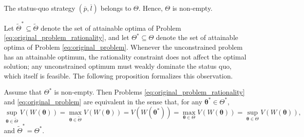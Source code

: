 \documentclass[a4paper,12pt]{article}
\begin{document}
\begin{corollary}\label{coro:non-empty_convex_theta}
The status-quo strategy $\left(\overline{p},\overline{l}\right)$ belongs to $\Theta$. Hence, $\Theta$ is non-empty.
\end{corollary}

Let $\tilde{\Theta}^*\subseteq\tilde{\Theta}$ denote the set of attainable optima of Problem \eqref{eq:original_problem_rationality}, and let $\Theta^*\subseteq\Theta$ denote the set of attainable optima of Problem \eqref{eq:original_problem}. Whenever the unconstrained problem has an attainable optimum, the rationality constraint does not affect the optimal solution; any unconstrained optimum must weakly dominate the status quo, which itself is feasible. The following proposition formalizes this observation.
\begin{proposition}\label{prop:remove_rationality}
Assume that $\Theta^*$ is non-empty. Then Problems \eqref{eq:original_problem_rationality} and \eqref{eq:original_problem} are equivalent in the sense that, for any ${\bm\theta}^*\in\Theta^*$,
\begin{equation}
\sup_{{\bm\theta}\in\tilde{\Theta}}V\left(W\left({\bm\theta}\right)\right)=\max_{{\bm\theta}\in\tilde{\Theta}}V\left(W\left({\bm\theta}\right)\right)=V\left(W\left({\bm\theta}^*\right)\right)=\max_{{\bm\theta}\in\Theta}V\left(W\left({\bm\theta}\right)\right)=\sup_{{\bm\theta}\in\Theta}V\left(W\left({\bm\theta}\right)\right),
\label{eq:all_equivalence}
\end{equation}
and $\tilde{\Theta}^*=\Theta^*$.
\end{proposition}
\end{document}
